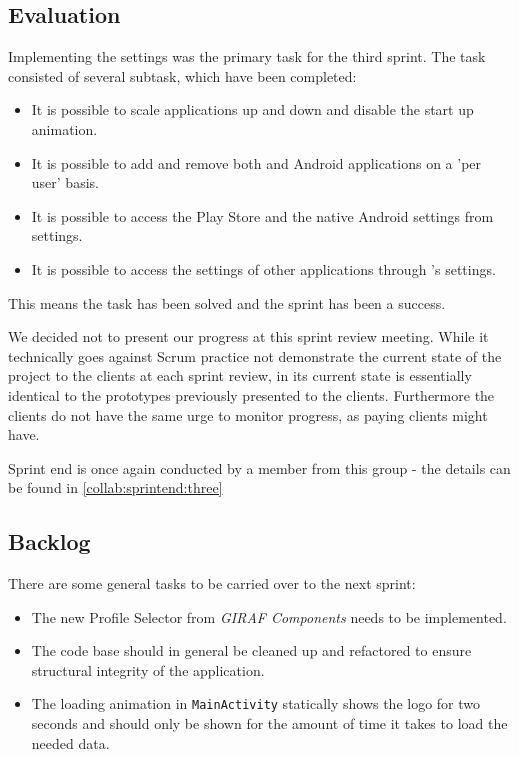 \subsection{Evaluation}
Implementing the settings was the primary task for the third sprint.
The task consisted of several subtask, which have been completed:

\begin{itemize}
\item It is possible to scale applications up and down and disable the start up animation.
\item It is possible to add and remove both \giraf and Android applications on a 'per user' basis.
\item It is possible to access the Play Store and the native Android settings from settings.
\item It is possible to access the settings of other \giraf applications through \launcher 's settings.
\end{itemize}

This means the task has been solved and the sprint has been a success. 

We decided not to present our progress at this sprint review meeting. 
While it technically goes against Scrum practice not demonstrate the current state of the project to the clients at each sprint review, \settingsactivity in its current state is essentially identical to the prototypes previously presented to the clients.
Furthermore the clients do not have the same urge to monitor progress, as paying clients might have.

Sprint end is once again conducted by a member from this group - the details can be found in \cref{collab:sprintend:three}

\subsection{Backlog}

There are some general tasks to be carried over to the next sprint:

\begin{itemize}
\item The new Profile Selector from \textit{GIRAF Components} needs to be implemented.
\item The code base should in general be cleaned up and refactored to ensure structural integrity of the application.
\item The loading animation in \lstinline!MainActivity! statically shows the logo for two seconds and should only be shown for the amount of time it takes to load the needed data.
\end{itemize}

